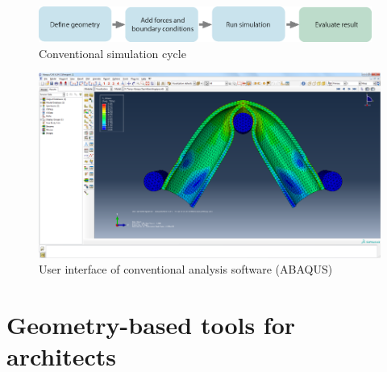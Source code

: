 \begin{figure}
  \includegraphics[width=310pt]{graphics/conventional-cycle.eps}
  \caption{Conventional simulation cycle}
  \label{fig:conventional-cycle}
\end{figure}

\begin{figure}
  \includegraphics[width=350pt]{graphics/abaqus.png}
  \caption{User interface of conventional analysis software (ABAQUS)}
  \label{fig:abaqus}
\end{figure}

\section{Geometry-based tools for architects}
